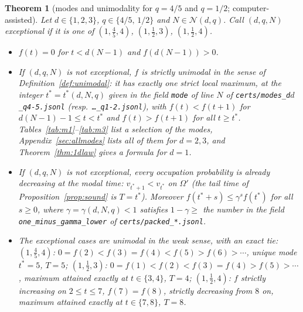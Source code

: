 \documentclass[11pt,a4paper]{article}
\newtheorem{theorem}{Theorem}
\theoremstyle{definition}
\theoremstyle{remark}
\begin{document}
\begin{theorem}[modes and unimodality for $q=4/5$ and $q=1/2$; computer-assisted]\label{thm:modes}
Let $d\in\{1,2,3\}$, $q\in\{4/5,\,1/2\}$ and $N\in\mathcal N(d,q)$. Call $(d,q,N)$ \emph{exceptional} if it is one of $(1,\tfrac45,4)$, $(1,\tfrac12,3)$, $(1,\tfrac12,4)$.
\begin{itemize}
\item[(a)] $f(t)=0$ for $t<d(N-1)$ and $f(d(N-1))>0$.
\item[(b)] If $(d,q,N)$ is not exceptional, $f$ is strictly unimodal in the sense of Definition~\ref{def:unimodal}: it has exactly one strict local maximum, at the integer $t^*=t^*(d,N,q)$ given in the field \texttt{mode} of line $N$ of \texttt{certs/modes\_d$d$\_q4-5.jsonl} (resp.\ \texttt{\dots\_q1-2.jsonl}), with $f(t)<f(t+1)$ for $d(N-1)-1\le t<t^*$ and $f(t)>f(t+1)$ for all $t\ge t^*$. Tables~\ref{tab:m1}--\ref{tab:m3} list a selection of the modes, Appendix~\ref{sec:allmodes} lists all of them for $d=2,3$, and Theorem~\ref{thm:1dlaw} gives a formula for $d=1$.
\item[(c)] If $(d,q,N)$ is not exceptional, every occupation probability is already decreasing at the modal time: $v_{t^*+1}<v_{t^*}$ on $\Omega'$ (the tail time of Proposition~\ref{prop:sound} is $T=t^*$). Moreover $f(t^*+s)\le\gamma^sf(t^*)$ for all $s\ge0$, where $\gamma=\gamma(d,N,q)<1$ satisfies $1-\gamma\ge$ the number in the field \texttt{one\_minus\_gamma\_lower} of \texttt{certs/packed\_*.jsonl}.
\item[(d)] The exceptional cases are unimodal in the weak sense, with an exact tie:
$(1,\tfrac45,4)$: $0=f(2)<f(3)=f(4)<f(5)>f(6)>\cdots$, unique mode $t^*=5$, $T=5$;
$(1,\tfrac12,3)$: $0=f(1)<f(2)<f(3)=f(4)>f(5)>\cdots$, maximum attained exactly at $t\in\{3,4\}$, $T=4$;
$(1,\tfrac12,4)$: $f$ strictly increasing on $2\le t\le 7$, $f(7)=f(8)$, strictly decreasing from $8$ on, maximum attained exactly at $t\in\{7,8\}$, $T=8$.
\end{itemize}
\end{theorem}
\end{document}
